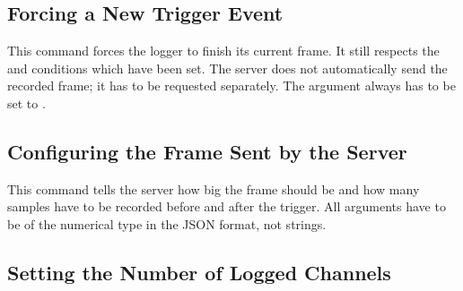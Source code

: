 \subsection{Forcing a New Trigger Event} %
\label{subsec:devguide:server:forcing_trigger}

This command forces the logger to  finish its current frame. It still respects
the  and  conditions which have been set.  The server does
not automatically send the recorded  frame; it has to be requested separately.
The argument  always has to be set to .


\subsection{Configuring the Frame Sent by the Server } %
\label{subsec:devguide:server:config_frame}

This command tells the server how big the frame should be and how many samples
have to be recorded before and after  the trigger. All arguments have to be of
the numerical type in the JSON format, not strings.


\subsection{Setting the Number of Logged Channels} %
\label{subsec:devguide:server:no_of_logged_channels}

